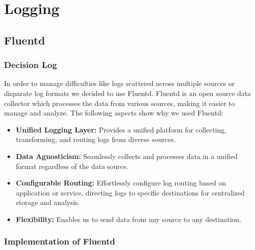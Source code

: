 \section{Logging}
\subsection{Fluentd}
\subsubsection{Decision Log}

In order to manage difficulties like logs scattered across multiple sources or disparate log formats we decided to use Fluentd.
Fluentd is an open source data collector which processes the data from various sources, making it easier to manage and analyze.
The following aspects show why we used Fluentd:
\begin{itemize}
	\item \textbf{Unified Logging Layer:} Provides a unified platform for collecting, transforming, and routing logs from diverse sources.
	\item \textbf{Data Agnosticism:} Seamlessly collects and processes data in a unified format regardless of the data source.
	\item \textbf{Configurable Routing:} Effortlessly configure log routing based on application or service, directing logs to specific destinations for centralized storage and analysis.
	\item \textbf{Flexibility:} Enables us to send data from any source to any destination.
\end{itemize}

\subsubsection{Implementation of Fluentd}


